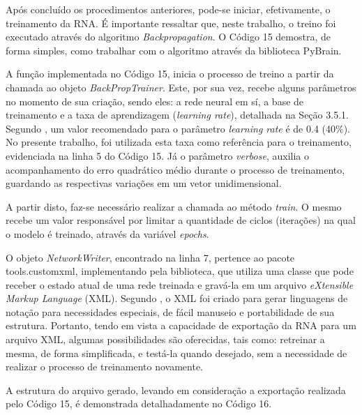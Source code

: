 Após concluído os procedimentos anteriores, pode-se iniciar, efetivamente, o treinamento da RNA. É importante ressaltar que, neste trabalho, o treino foi executado através do algoritmo \textit{Backpropagation}. O Código 15 demostra, de forma simples, como trabalhar com o algoritmo através da biblioteca PyBrain.



A função implementada no Código 15, inicia o processo de treino a partir da chamada ao objeto \textit{BackPropTrainer}. Este, por sua vez, recebe alguns parâmetros no momento de sua criação, sendo eles: a rede neural em sí, a base de treinamento e a taxa de aprendizagem (\textit{learning rate}), detalhada na Seção 3.5.1. Segundo , um valor recomendado para o parâmetro \textit{learning rate} é de 0.4 (40\%). No presente trabalho, foi utilizada esta taxa como referência para o treinamento, evidenciada na linha 5 do Código 15. Já o parâmetro \textit{verbose}, auxilia o acompanhamento do erro quadrático médio durante o processo de treinamento, guardando as respectivas variações em um vetor unidimensional.

A partir disto, faz-se necessário realizar a chamada ao método \textit{train}. O mesmo recebe um valor responsável por limitar a quantidade de ciclos (iterações) na qual o modelo é treinado, através da variável \textit{epochs}.

O objeto \textit{NetworkWriter}, encontrado na linha 7, pertence ao pacote tools.customxml, implementando pela biblioteca, que utiliza uma classe que pode receber o estado atual de uma rede treinada e gravá-la em um arquivo \textit{eXtensible Markup Language} (XML). Segundo , o XML foi criado para gerar linguagens de notação para necessidades especiais, de fácil manuseio e portabilidade de sua estrutura. Portanto, tendo em vista a capacidade de exportação da RNA para um arquivo XML, algumas possibilidades são oferecidas, tais como: retreinar a mesma, de forma simplificada, e testá-la quando desejado, sem a necessidade de realizar o processo de treinamento novamente.

A estrutura do arquivo gerado, levando em consideração a exportação realizada pelo Código 15, é demonstrada detalhadamente no Código 16.



